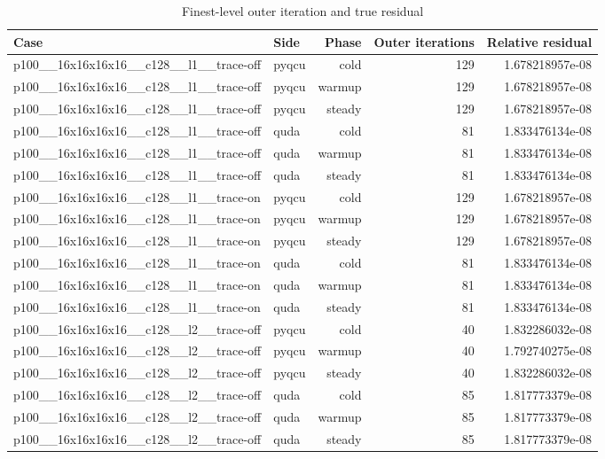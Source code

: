 \begin{table}[htbp]
\centering
\caption{Finest-level outer iteration and true residual}
\small
\begin{tabular}{@{}llrrr@{}}
\toprule
Case & Side & Phase & Outer iterations & Relative residual \\
\midrule
p100\_\_16x16x16x16\_\_c128\_\_l1\_\_trace-off & pyqcu & cold & 129 & 1.678218957e-08 \\
p100\_\_16x16x16x16\_\_c128\_\_l1\_\_trace-off & pyqcu & warmup & 129 & 1.678218957e-08 \\
p100\_\_16x16x16x16\_\_c128\_\_l1\_\_trace-off & pyqcu & steady & 129 & 1.678218957e-08 \\
p100\_\_16x16x16x16\_\_c128\_\_l1\_\_trace-off & quda & cold & 81 & 1.833476134e-08 \\
p100\_\_16x16x16x16\_\_c128\_\_l1\_\_trace-off & quda & warmup & 81 & 1.833476134e-08 \\
p100\_\_16x16x16x16\_\_c128\_\_l1\_\_trace-off & quda & steady & 81 & 1.833476134e-08 \\
p100\_\_16x16x16x16\_\_c128\_\_l1\_\_trace-on & pyqcu & cold & 129 & 1.678218957e-08 \\
p100\_\_16x16x16x16\_\_c128\_\_l1\_\_trace-on & pyqcu & warmup & 129 & 1.678218957e-08 \\
p100\_\_16x16x16x16\_\_c128\_\_l1\_\_trace-on & pyqcu & steady & 129 & 1.678218957e-08 \\
p100\_\_16x16x16x16\_\_c128\_\_l1\_\_trace-on & quda & cold & 81 & 1.833476134e-08 \\
p100\_\_16x16x16x16\_\_c128\_\_l1\_\_trace-on & quda & warmup & 81 & 1.833476134e-08 \\
p100\_\_16x16x16x16\_\_c128\_\_l1\_\_trace-on & quda & steady & 81 & 1.833476134e-08 \\
p100\_\_16x16x16x16\_\_c128\_\_l2\_\_trace-off & pyqcu & cold & 40 & 1.832286032e-08 \\
p100\_\_16x16x16x16\_\_c128\_\_l2\_\_trace-off & pyqcu & warmup & 40 & 1.792740275e-08 \\
p100\_\_16x16x16x16\_\_c128\_\_l2\_\_trace-off & pyqcu & steady & 40 & 1.832286032e-08 \\
p100\_\_16x16x16x16\_\_c128\_\_l2\_\_trace-off & quda & cold & 85 & 1.817773379e-08 \\
p100\_\_16x16x16x16\_\_c128\_\_l2\_\_trace-off & quda & warmup & 85 & 1.817773379e-08 \\
p100\_\_16x16x16x16\_\_c128\_\_l2\_\_trace-off & quda & steady & 85 & 1.817773379e-08 \\

\end{tabular}
\end{table}
